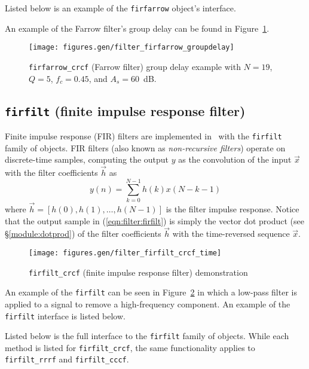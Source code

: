%
Listed below is an example of the {\tt firfarrow} object's
interface.
%

%
An example of the Farrow filter's group delay can be found in
Figure~\ref{fig:module:filter:firfarrow_groupdelay}.
%
\begin{figure}
\centering
  \texttt{[image: figures.gen/filter\_firfarrow\_groupdelay]}
\caption{{\tt firfarrow\_crcf} (Farrow filter) group delay example
    with $N=19$, $Q=5$, $f_c=0.45$, and $A_s=60$~dB.}
\label{fig:module:filter:firfarrow_groupdelay}
\end{figure}
%



%
%
\subsection{{\tt firfilt} (finite impulse response filter)}
\label{module:filter:firfilt}
Finite impulse response (FIR) filters are implemented in \liquid\ with
the {\tt firfilt} family of objects.
FIR filters (also known as {\em non-recursive filters}) operate on
discrete-time samples, computing the output $y$ as the convolution of
the input $\vec{x}$ with the filter coefficients $\vec{h}$ as
%
\begin{equation}
\label{eqn:filter:firfilt}
    y(n) = \sum_{k=0}^{N-1}{ h(k) x(N-k-1) }
\end{equation}
%
where $\vec{h} = [h(0),h(1),\ldots,h(N-1)]$
is the filter impulse response.
Notice that the output sample in (\ref{eqn:filter:firfilt})
is simply the vector dot product (see \S\ref{module:dotprod})
of the filter coefficients $\vec{h}$ with the time-reversed sequence
$\vec{x}$.
%
\begin{figure}
\centering
  \texttt{[image: figures.gen/filter\_firfilt\_crcf\_time]}
\caption{{\tt firfilt\_crcf} (finite impulse response filter) demonstration}
\label{fig:module:filter:firfilt_crcf}
\end{figure}
%
An example of the {\tt firfilt} can be seen in
Figure~\ref{fig:module:filter:firfilt_crcf}
in which a low-pass filter is applied to a signal to remove a
high-frequency component.
%
An example of the {\tt firfilt} interface is listed below.
%

%
Listed below is the full interface to the {\tt firfilt} family of
objects.
While each method is listed for {\tt firfilt\_crcf}, the same
functionality applies to {\tt firfilt\_rrrf} and {\tt firfilt\_cccf}.
%
